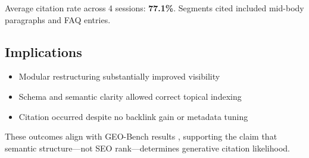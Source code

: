 Average citation rate across 4 sessions: \textbf{77.1\%}. Segments cited included mid-body paragraphs and FAQ entries.

\subsection{Implications}
\begin{itemize}
  \item Modular restructuring substantially improved visibility
  \item Schema and semantic clarity allowed correct topical indexing
  \item Citation occurred despite no backlink gain or metadata tuning
\end{itemize}
These outcomes align with GEO-Bench results \cite{aggarwal2024geo}, supporting the claim that semantic structure---not SEO rank---determines generative citation likelihood.
